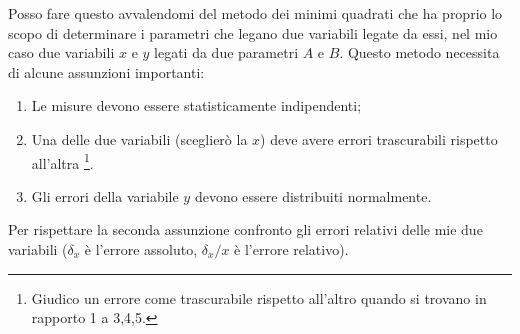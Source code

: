 \documentclass{article}
\begin{document}
	Posso fare questo avvalendomi del metodo dei minimi quadrati che ha  proprio lo scopo di determinare i parametri che legano due variabili legate da essi, nel mio caso due variabili $x$ e $y$ legati da due parametri $A$ e $B$. Questo metodo necessita di alcune assunzioni importanti: 
	
	\begin{enumerate}
		\item Le misure devono essere statisticamente indipendenti;
		\item Una delle due variabili (sceglierò la $x$) deve avere errori trascurabili rispetto all'altra \footnote{Giudico un errore come trascurabile rispetto all'altro quando si trovano in rapporto 1 a 3,4,5.}.
		\item Gli errori della variabile $y$ devono essere distribuiti normalmente.
	\end{enumerate}
	
	\noindent
	Per rispettare la seconda assunzione confronto gli errori relativi delle mie due variabili ($\delta_x$ è l'errore assoluto, $\delta_x/x$ è l'errore relativo).
	
\end{document}
